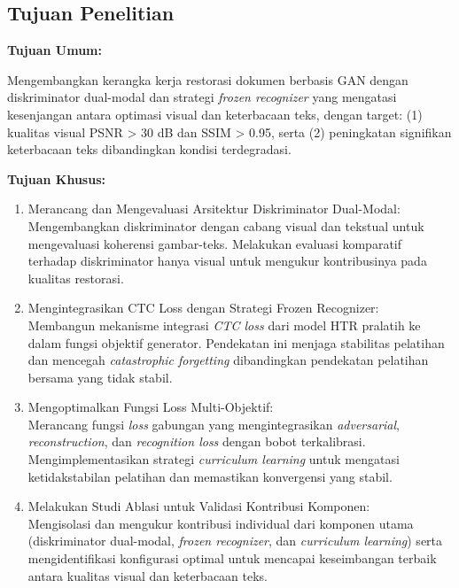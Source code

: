 \documentclass[12pt,a4paper]{article}
\begin{document}
\subsection{Tujuan Penelitian}
\label{subsec:tujuan-penelitian}

\textbf{Tujuan Umum:}

Mengembangkan kerangka kerja restorasi dokumen berbasis GAN dengan diskriminator dual-modal dan strategi \textit{frozen recognizer} yang mengatasi kesenjangan antara optimasi visual dan keterbacaan teks, dengan target: (1) kualitas visual PSNR > 30 dB dan SSIM > 0.95, serta (2) peningkatan signifikan keterbacaan teks dibandingkan kondisi terdegradasi.

\vspace{0.8em}
\textbf{Tujuan Khusus:}

\begin{enumerate}[label=\textbf{T\arabic*:}, leftmargin=1cm]
    \item Merancang dan Mengevaluasi Arsitektur Diskriminator Dual-Modal: \\
    Mengembangkan diskriminator dengan cabang visual dan tekstual untuk mengevaluasi koherensi gambar-teks. Melakukan evaluasi komparatif terhadap diskriminator hanya visual untuk mengukur kontribusinya pada kualitas restorasi.

    \item Mengintegrasikan CTC Loss dengan Strategi Frozen Recognizer: \\
    Membangun mekanisme integrasi \textit{CTC loss} dari model HTR pralatih ke dalam fungsi objektif generator. Pendekatan ini menjaga stabilitas pelatihan dan mencegah \textit{catastrophic forgetting} dibandingkan pendekatan pelatihan bersama yang tidak stabil.

    \item Mengoptimalkan Fungsi Loss Multi-Objektif: \\
    Merancang fungsi \textit{loss} gabungan yang mengintegrasikan \textit{adversarial}, \textit{reconstruction}, dan \textit{recognition loss} dengan bobot terkalibrasi. Mengimplementasikan strategi \textit{curriculum learning} untuk mengatasi ketidakstabilan pelatihan dan memastikan konvergensi yang stabil.

    \item Melakukan Studi Ablasi untuk Validasi Kontribusi Komponen: \\
    Mengisolasi dan mengukur kontribusi individual dari komponen utama (diskriminator dual-modal, \textit{frozen recognizer}, dan \textit{curriculum learning}) serta mengidentifikasi konfigurasi optimal untuk mencapai keseimbangan terbaik antara kualitas visual dan keterbacaan teks.
\end{enumerate}
\end{document}

